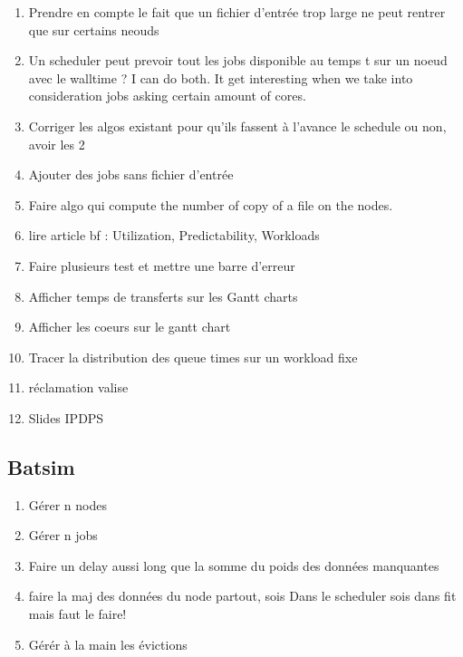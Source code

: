 \documentclass[a4paper]{article}
\begin{document}
\begin{enumerate}
			\item Prendre en compte le fait que un fichier d'entrée trop large ne peut rentrer que sur certains neouds
			\item Un scheduler peut prevoir tout les jobs disponible au temps t sur un noeud avec le walltime ? I can do both. It get interesting when we take into consideration jobs asking certain amount of cores. 
			\item Corriger les algos existant pour qu'ils fassent à l'avance le schedule ou non, avoir les 2
			\item Ajouter des jobs sans fichier d'entrée
			\item Faire algo qui compute the number of copy of a file on the nodes.
			\item lire article bf : Utilization, Predictability, Workloads
			\item Faire plusieurs test et mettre une barre d'erreur
			\item Afficher temps de transferts sur les Gantt charts
			\item Afficher les coeurs sur le gantt chart
			\item Tracer la distribution des queue times sur un workload fixe
			\item réclamation valise
			\item Slides IPDPS
		\end{enumerate}
	\subsection{Batsim}
		\begin{enumerate}
			\item Gérer n nodes
			\item Gérer n jobs
			\item Faire un delay aussi long que la somme du poids des données manquantes
			\item faire la maj des données du node partout, sois Dans le scheduler sois dans fit mais faut le faire!
			\item Gérér à la main les évictions
		\end{enumerate}
\end{document}
